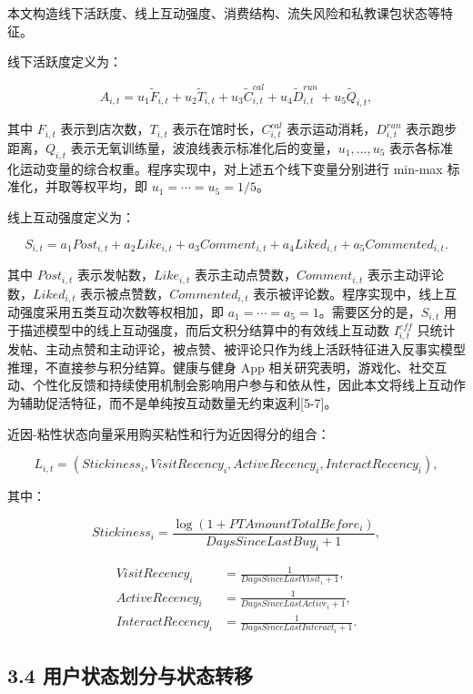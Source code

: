 \documentclass[
  12pt,
]{ctexart}
\begin{document}
本文构造线下活跃度、线上互动强度、消费结构、流失风险和私教课包状态等特征。

线下活跃度定义为：

\[
A_{i,t}=u_1\widetilde{F}_{i,t}+u_2\widetilde{T}_{i,t}+u_3\widetilde{C}^{cal}_{i,t}+u_4\widetilde{D}^{run}_{i,t}+u_5\widetilde{Q}_{i,t},
\tag{1}
\]

其中 \(F_{i,t}\) 表示到店次数，\(T_{i,t}\) 表示在馆时长，\(C_{i,t}^{cal}\) 表示运动消耗，\(D_{i,t}^{run}\) 表示跑步距离，\(Q_{i,t}\) 表示无氧训练量，波浪线表示标准化后的变量，\(u_1,\ldots,u_5\) 表示各标准化运动变量的综合权重。程序实现中，对上述五个线下变量分别进行 min-max 标准化，并取等权平均，即 \(u_1=\cdots=u_5=1/5\)。

线上互动强度定义为：

\[
S_{i,t}=a_1Post_{i,t}+a_2Like_{i,t}+a_3Comment_{i,t}+a_4Liked_{i,t}+a_5Commented_{i,t}.
\tag{2}
\]

其中 \(Post_{i,t}\) 表示发帖数，\(Like_{i,t}\) 表示主动点赞数，\(Comment_{i,t}\) 表示主动评论数，\(Liked_{i,t}\) 表示被点赞数，\(Commented_{i,t}\) 表示被评论数。程序实现中，线上互动强度采用五类互动次数等权相加，即 \(a_1=\cdots=a_5=1\)。需要区分的是，\(S_{i,t}\) 用于描述模型中的线上互动强度，而后文积分结算中的有效线上互动数 \(I_{i,t}^{eff}\) 只统计发帖、主动点赞和主动评论，被点赞、被评论只作为线上活跃特征进入反事实模型推理，不直接参与积分结算。健康与健身 App 相关研究表明，游戏化、社交互动、个性化反馈和持续使用机制会影响用户参与和依从性，因此本文将线上互动作为辅助促活特征，而不是单纯按互动数量无约束返利{[}5-7{]}。

近因-粘性状态向量采用购买粘性和行为近因得分的组合：

\[
L_{i,t}=\left(Stickiness_i,VisitRecency_i,ActiveRecency_i,InteractRecency_i\right),
\tag{3}
\]

其中：

\[
Stickiness_i=\frac{\log(1+PTAmountTotalBefore_i)}{DaysSinceLastBuy_i+1},
\tag{4}
\]

\[
\begin{aligned}
VisitRecency_i&=\frac{1}{DaysSinceLastVisit_i+1},\\
ActiveRecency_i&=\frac{1}{DaysSinceLastActive_i+1},\\
InteractRecency_i&=\frac{1}{DaysSinceLastInteract_i+1}.
\end{aligned}
\tag{5}
\]

\hypertarget{ux7528ux6237ux72b6ux6001ux5212ux5206ux4e0eux72b6ux6001ux8f6cux79fb}{%
\subsection{3.4 用户状态划分与状态转移}\label{ux7528ux6237ux72b6ux6001ux5212ux5206ux4e0eux72b6ux6001ux8f6cux79fb}}
\end{document}
